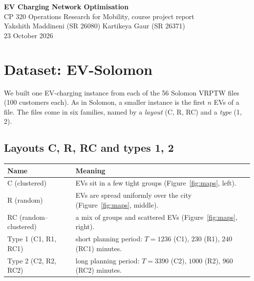 \documentclass[11pt,a4paper]{article}
\begin{document}
\begin{center}
{\LARGE\bfseries\color{headblue} EV Charging Network Optimisation}\\[6pt]
{\normalsize CP 320 Operations Research for Mobility, course project report}\\[2pt]
{\normalsize Yakshith Maddineni (SR 26080) \quad\textperiodcentered\quad Kartikeya Gaur (SR 26371)}\\[2pt]
{\normalsize 23 October 2026}
\end{center}



\section{Dataset: EV-Solomon}

We built one EV-charging instance from each of the 56 Solomon VRPTW files (100 customers each). As in Solomon, a smaller instance is the first $n$ EVs of a file. The files come in six families, named by a \emph{layout} (C, R, RC) and a \emph{type} (1, 2).

\subsection{Layouts C, R, RC and types 1, 2}

\begin{xltabular}{\textwidth}{@{}>{\raggedright\arraybackslash}p{4.3cm}X@{}}
\toprule
\textbf{Name} & \textbf{Meaning} \\
\midrule
C (clustered) & EVs sit in a few tight groups (Figure~\ref{fig:maps}, left). \\
R (random) & EVs are spread uniformly over the city (Figure~\ref{fig:maps}, middle). \\
RC (random--clustered) & a mix of groups and scattered EVs (Figure~\ref{fig:maps}, right). \\
\midrule
Type 1 (C1, R1, RC1) & short planning period: $T=1236$ (C1), $230$ (R1), $240$ (RC1) minutes. \\
Type 2 (C2, R2, RC2) & long planning period: $T=3390$ (C2), $1000$ (R2), $960$ (RC2) minutes. \\
\bottomrule
\end{xltabular}\addtocounter{table}{-1}
\end{document}
